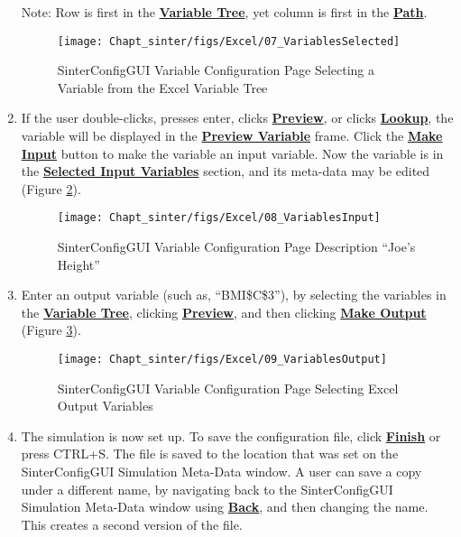 \begin{enumerate}
Note: Row is first in the \textbf{\underline{Variable Tree}}, yet column is first in the \textbf{\underline{Path}}.

\begin{figure}[H]
	\begin{center}
		\texttt{[image: Chapt\_sinter/figs/Excel/07\_VariablesSelected]}
		\caption{SinterConfigGUI Variable Configuration Page Selecting a Variable from the Excel Variable Tree}
		\label{fig.sinter.excel.variableselected}
	\end{center}
\end{figure}

\item If the user double-clicks, presses enter, clicks \textbf{\underline{Preview}}, or clicks \textbf{\underline{Lookup}},
the  variable will be displayed in the \textbf{\underline{Preview Variable}} frame.  Click the \textbf{\underline{Make Input}} button to make the variable an input variable.  Now the variable is in the \textbf{\underline{Selected Input Variables}} section, and its meta-data may be edited (Figure \ref{fig.sinter.excel.variableinputs}).
\begin{figure}[H]
	\begin{center}
		\texttt{[image: Chapt\_sinter/figs/Excel/08\_VariablesInput]}
		\caption{SinterConfigGUI Variable Configuration Page Description ``Joe's Height''}
		\label{fig.sinter.excel.variableinputs}
	\end{center}
\end{figure}

\item Enter an output variable (such as, ``BMI\$C\$3''), by selecting the variables in the \textbf{\underline{Variable Tree}}, clicking \textbf{\underline{Preview}}, and then clicking \textbf{\underline{Make Output}} (Figure \ref{fig.sinter.excel.variableoutput}).

\begin{figure}[H]
	\begin{center}
		\texttt{[image: Chapt\_sinter/figs/Excel/09\_VariablesOutput]}
		\caption{SinterConfigGUI Variable Configuration Page Selecting Excel Output Variables}
		\label{fig.sinter.excel.variableoutput}
	\end{center}
\end{figure}

\item The simulation is now set up.  To save the configuration file, click \textbf{\underline{Finish}} or press CTRL+S.  The file is saved to the location that was set on the SinterConfigGUI Simulation Meta-Data window.  A user can save a copy under a different name, by navigating back to the SinterConfigGUI Simulation Meta-Data window using \textbf{\underline{Back}}, and then changing the name.  This creates a second version of the file.

\end{enumerate}

